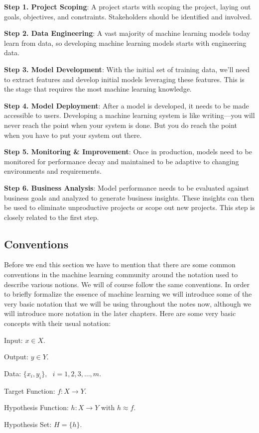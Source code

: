 \bit
\item \textbf{Step 1. Project Scoping}: A project starts with scoping the project, laying out goals, objectives, and
constraints. Stakeholders should be identified and involved.
\item \textbf{Step 2. Data Engineering}: A vast majority of machine learning models today learn from data, so developing
machine learning models starts with engineering data.
\item \textbf{Step 3. Model Development}: With the initial set of training data, we'll need to extract features and
develop initial models leveraging these features. This is the stage that requires the most machine learning knowledge.
\item \textbf{Step 4. Model Deployment}: After a model is developed, it needs to be made accessible to users. Developing
a machine learning system is like writing—you will never reach the point when your system is done. But you do reach the
point when you have to put your system out there.
\item \textbf{Step 5. Monitoring \& Improvement}: Once in production, models need to be monitored for performance decay
and maintained to be adaptive to changing environments and requirements.
\item \textbf{Step 6. Business Analysis}: Model performance needs to be evaluated against business goals and analyzed to
generate business insights. These insights can then be used to eliminate unproductive projects or scope out new projects.
This step is closely related to the first step.
\eit


\subsection{Conventions}

Before we end this section we have to mention that there are some common conventions in the machine learning 
community around the notation used to describe various notions. We will of course follow the same conventions. In 
order to briefly formalize the essence of machine learning we will introduce some of the very basic notation that we 
will be using throughout the notes now, although we will introduce more notation in the later chapters. Here are some
very basic concepts with their usual notation:
\bit
\item Input: $x \in X$.
\item Output: $y \in Y$.
\item Data: $\{ x_{i}, y_{i} \}, \:\:\: i=1,2,3,\ldots, m$.
\item Target Function: $f: X \to Y$.
\item Hypothesis Function: $h: X \to Y$ with $ h \approx f$.
\item Hypothesis Set: $H = \{h\}$.
\eit

